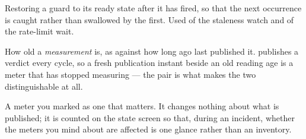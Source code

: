 \begin{description}[style=nextline, leftmargin=0pt]
\item[Re-arm] Restoring a guard to its ready state after it has fired, so that the next
  occurrence is caught rather than swallowed by the first. Used of the staleness watch and of
  the rate-limit wait.

\item[Reading age] How old a \emph{measurement} is, as against how long ago \prog last
  published it. \prog publishes a verdict every cycle, so a fresh publication instant beside an
  old reading age is a meter that has stopped measuring --- the pair is what makes the two
  distinguishable at all.

\item[Priority meter] A meter you marked as one that matters. It changes nothing about what is
  published; it is counted on the state screen so that, during an incident, whether the meters
  you mind about are affected is one glance rather than an inventory.
\end{description}
